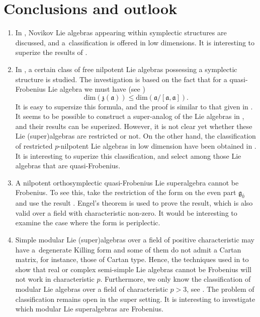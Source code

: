 \documentclass[pdftex]{sigma}
\numberwithin{equation}{section}
\begin{document}
\section{Conclusions and outlook}
\begin{enumerate}\itemsep=0pt
 \item[(1)] In \cite{AM}, Novikov Lie algebras appearing within symplectic structures are discussed, and a~classification is offered in low dimensions. It is interesting to superize the results of \cite{AM}.

 \item[(2)] In \cite{D}, a certain class of free nilpotent Lie algebras possessing a symplectic structure is studied. The investigation is based on the fact that for a quasi-Frobenius Lie algebra we must have (see \cite{BC})
\[
\mathrm{dim}(\mathfrak{z}(\mathfrak{a}))\leq \mathrm{dim}( \mathfrak{a}/[\mathfrak{a}, \mathfrak{a}]).
\]
It is easy to supersize this formula, and the proof is similar to that given in \cite{BC}. It seems to be possible to construct a super-analog of the Lie algebras in \cite{D}, and their results can be superized. However, it is not clear yet whether these Lie (super)algebras are restricted or not.
On the other hand, the classification of restricted $p$-nilpotent Lie algebras in low dimension have been obtained in \cite{DU, MS}. It is interesting to superize this classification, and select among those Lie algebras that are quasi-Frobenius.

 \item[(3)] A nilpotent orthosymplectic quasi-Frobenius Lie superalgebra cannot be Frobenius. To see this, take the restriction of the form on the even part ${\mathfrak g}_{{\bar 0}}$ and use the result \cite[Proposition~6]{GR}. Engel's theorem is used to prove the result, which is also valid over a field with characteristic non-zero. It would be interesting to examine the case where the form is periplectic.

 \item[(4)] Simple modular Lie (super)algebras over a field of positive characteristic may have a~degenerate Killing form and some of them do not admit a Cartan matrix, for instance, those of Cartan type. Hence, the techniques used in \cite{GR} to show that real or complex semi-simple Lie algebras cannot be Frobenius will not work in characteristic $p$. Furthermore, we only know the classification of modular Lie algebras over a field of characteristic $p>3$, see \cite{S2}. The problem of classification remains open in the super setting. It is interesting to investigate which modular Lie superalgebras are Frobenius.


\end{enumerate}
\end{document}
